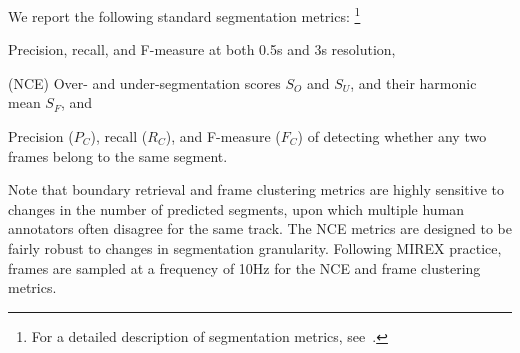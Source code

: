 \documentclass{article}
\begin{document}
We report the following standard segmentation metrics:
\footnote{For a detailed description of segmentation metrics, see~\cite{mirexstructure}.}
\begin{description}\addtolength{\itemsep}{-0.25\baselineskip}%
\item[Boundary retrieval] Precision, recall, and F-measure at both 0.5s and 3s resolution,
\item[Normalized conditional entropy] (NCE) Over- and under-segmentation scores $S_O$ and $S_U$, and their harmonic
mean $S_F$, and
\item[Frame clustering] Precision ($P_C$), recall ($R_C$), and F-measure ($F_C$) of detecting whether any two frames 
belong to the same segment.
\end{description}
Note that boundary retrieval and frame clustering metrics are highly sensitive to changes in the number of
predicted segments, upon which multiple human annotators often disagree for the same track. 
The NCE metrics are designed to be fairly robust to changes in segmentation granularity.
Following MIREX practice, frames are sampled at a frequency of 10Hz for the NCE and frame clustering metrics. 
\end{document}
